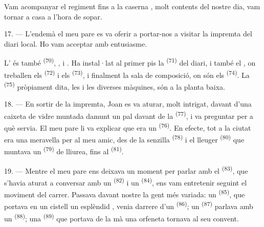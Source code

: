 Vam acompanyar el regiment fins a la caserna , molt contents del nostre
dia, vam tornar a casa a l'hora de sopar.

\VUsaut{3.0mm}

17. --- L'endemà el meu pare es va oferir a portar-nos a visitar la impremta del
diari local. Ho vam acceptar amb entusiasme.

L' és també  \textsuperscript{(70)},
,  i . Ha instal·lat al
primer pis la  \textsuperscript{(71)} del diari, i també el
, on treballen els 
\textsuperscript{(72)} i els  \textsuperscript{(73)}, i
finalment la sala de composició, on són els 
\textsuperscript{(74)}. La  \textsuperscript{(75)}
pròpiament dita, les  i les diverses màquines, són a la planta
baixa.

\VUsaut{3.0mm}

18. --- En sortir de la impremta, Joan es va aturar, molt intrigat, davant d'una
caixeta de vidre muntada damunt un pal davant de la 
\textsuperscript{(77)}, i va preguntar per a què servia. El meu pare li va
explicar que era un  \textsuperscript{(76)}. En efecte,
tot a la ciutat era una meravella per al meu amic, des de la senzilla
 \textsuperscript{(78)} i el lleuger  \textsuperscript{(80)} que muntava un 
\textsuperscript{(79)} de lliurea, fins al 
\textsuperscript{(81)}.

19. --- Mentre el meu pare ens deixava un moment per parlar amb el
 \textsuperscript{(83)}, que s'havia aturat a
conversar amb un  \textsuperscript{(82)} i un 
\textsuperscript{(84)}, ens vam entretenir seguint el moviment del carrer. Passava
davant nostre la gent més variada: un 
\textsuperscript{(85)}, que portava en un cistell un esplèndid ,
venia darrere d'un  \textsuperscript{(86)}; un 
\textsuperscript{(87)} parlava amb un  \textsuperscript{(88)}; una
 \textsuperscript{(89)} que portava de la mà una orfeneta tornava al
seu convent.

